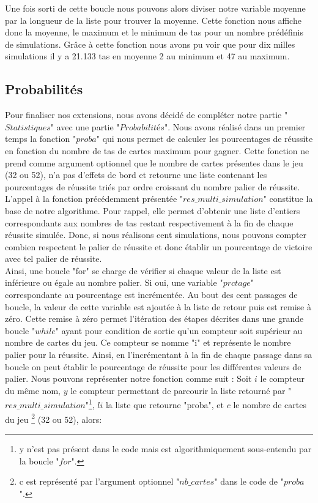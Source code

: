 \documentclass[10pt,a4paper,french,titlepage]{article}
\theoremstyle{definition}
\begin{document}
Une fois sorti de cette boucle nous pouvons alors diviser notre variable moyenne par la longueur de la liste pour trouver la moyenne. Cette fonction nous affiche donc la moyenne, le maximum et le minimum de tas pour un nombre prédéfinis de simulations. Grâce à cette fonction nous avons pu voir que pour dix milles simulations il y a 21.133 tas en moyenne 2 au minimum et 47 au maximum.


\subsection{Probabilités}
Pour finaliser nos extensions, nous avons décidé de compléter notre partie "$Statistiques$" avec une partie "$Probabilités$". Nous avons réalisé dans un premier temps la fonction "$proba$" qui nous permet de calculer les pourcentages de réussite en fonction du nombre de tas de cartes maximum pour gagner. Cette fonction ne prend comme argument optionnel que le nombre de cartes présentes dans le jeu (32 ou 52), n'a pas d'effets de bord et retourne une liste contenant les pourcentages de réussite triés par ordre croissant du nombre palier de réussite. L'appel à la fonction précédemment présentée "$res\_multi\_simulation$" constitue la base de notre algorithme. Pour rappel, elle permet d'obtenir une liste d'entiers correspondants aux nombres de tas restant respectivement à la fin de chaque réussite simulée.
Donc, si nous réalisons cent simulations, nous pouvons compter combien respectent le palier de réussite et donc établir un pourcentage de victoire avec tel palier de réussite.\\

Ainsi, une boucle "for" se charge de vérifier si chaque valeur de la liste est inférieure ou égale au nombre palier. Si oui, une variable "$prctage$" 
correspondante au pourcentage est incrémentée. Au bout des cent passages de boucle, la valeur de cette variable est ajoutée à la liste de retour puis est remise à zéro. Cette remise à zéro permet l'itération des étapes décrites dans une grande boucle "$while$" ayant pour condition de sortie qu'un compteur soit supérieur au nombre de cartes du jeu. Ce compteur se nomme "i" et représente le nombre palier pour la réussite. Ainsi, en l'incrémentant à la fin de chaque passage dans sa boucle on peut établir le pourcentage de réussite pour les différentes valeurs de palier. Nous pouvons représenter notre fonction comme suit : 
Soit $i$ le compteur du même nom, $y$ le compteur permettant de parcourir la liste retourné par "$res\_multi\_simulation$"\footnote{y n'est pas présent dans le code mais est algorithmiquement sous-entendu par la boucle "$for$".}, $li$ la liste que retourne "proba", et $c$ le nombre de cartes du jeu \footnote{c est représenté par l'argument optionnel "$nb\_cartes$" dans le code de "$proba$".} (32 ou 52), alors:
\end{document}
